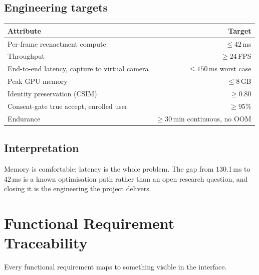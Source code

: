 \documentclass[11pt,a4paper]{report}
\begin{document}
\section{Engineering targets}

\begin{center}
\begin{tabular}{lr}
\toprule
\textbf{Attribute} & \textbf{Target} \\
\midrule
Per-frame reenactment compute & $\leq 42$\,ms \\
Throughput & $\geq 24$\,FPS \\
End-to-end latency, capture to virtual camera & $\leq 150$\,ms worst case \\
Peak GPU memory & $\leq 8$\,GB \\
Identity preservation (CSIM) & $\geq 0.80$ \\
Consent-gate true accept, enrolled user & $\geq 95\%$ \\
Endurance & $\geq 30$\,min continuous, no OOM \\
\bottomrule
\end{tabular}
\end{center}

\section{Interpretation}

Memory is comfortable; latency is the whole problem. The gap from 130.1\,ms to
42\,ms is a known optimisation path rather than an open research question, and
closing it is the engineering the project delivers.

\chapter{Functional Requirement Traceability}

Every functional requirement maps to something visible in the interface.
\end{document}
